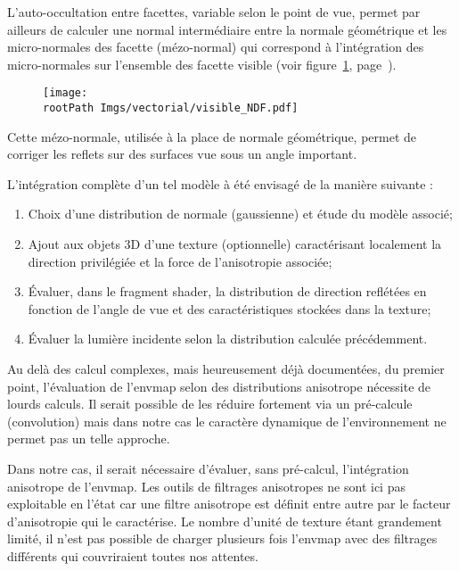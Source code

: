 \documentclass[10pt,a4paper,twoside, twocolumn]{report}
\newcommand*{\rootPath}{../}
\begin{document}
L'auto-occultation entre facettes, variable selon le point de vue, permet par ailleurs de calculer une normal intermédiaire entre la normale géométrique et les micro-normales des facette (mézo-normal) qui correspond à l’intégration des micro-normales sur l'ensemble des facette visible (voir figure~\ref{fig:svg:mezonormales}, page~\pageref{fig:svg:mezonormales}).

\begin{figure}\centering
	\texttt{[image: \\rootPath Imgs/vectorial/visible\_NDF.pdf]}
	\label{fig:svg:mezonormales}
\end{figure}

Cette mézo-normale, utilisée à la place de normale géométrique, permet de corriger les reflets sur des surfaces vue sous un angle important.

L’intégration complète d'un tel modèle à été envisagé de la manière suivante :
\begin{enumerate}
	\item Choix d'une distribution de normale (gaussienne) et étude du modèle associé;
	\item Ajout aux objets 3D d'une texture (optionnelle) caractérisant localement la direction privilégiée et la force de l'anisotropie associée;
	\item Évaluer, dans le fragment shader, la distribution de direction reflétées en fonction de l'angle de vue et des caractéristiques stockées dans la texture;
	\item Évaluer la lumière incidente selon la distribution calculée précédemment.
\end{enumerate}

Au delà des calcul complexes, mais heureusement déjà documentées, du premier point\cite{Heitz2013a}, l'évaluation de l'envmap selon des distributions anisotrope nécessite de lourds calculs.
Il serait possible de les réduire fortement via un pré-calcule (convolution) mais dans notre cas le caractère dynamique de l'environnement ne permet pas un telle approche.

Dans notre cas, il serait nécessaire d'évaluer, sans pré-calcul, l’intégration anisotrope de l'envmap.
Les outils de filtrages anisotropes ne sont ici pas exploitable en l’état car une filtre anisotrope est définit entre autre par le facteur d'anisotropie qui le caractérise. Le nombre d'unité de texture étant grandement limité, il n'est pas possible de charger plusieurs fois l'envmap avec des filtrages différents qui couvriraient toutes nos attentes.
\end{document}
